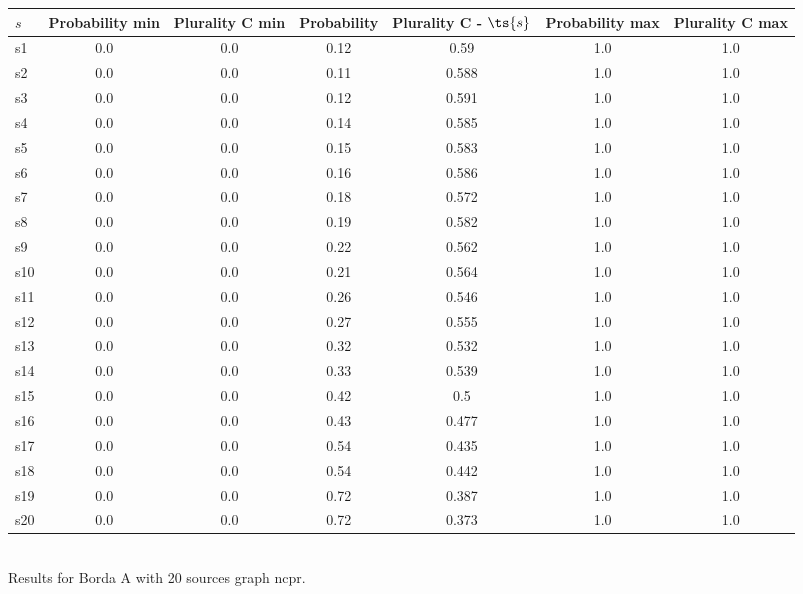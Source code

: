 \documentclass{article}
\begin{document}
\noindent\begin{tabular}{|l|c|c|c|c|c|c|}
\hline
$s$& Probability min & Plurality C min & Probability & Plurality C - $\ts{s}$ & Probability max & Plurality C max\\
\hline
s1 &0.0 & 0.0 & 0.12 & 0.59 & 1.0 & 1.0\\
\hline
s2 &0.0 & 0.0 & 0.11 & 0.588 & 1.0 & 1.0\\
\hline
s3 &0.0 & 0.0 & 0.12 & 0.591 & 1.0 & 1.0\\
\hline
s4 &0.0 & 0.0 & 0.14 & 0.585 & 1.0 & 1.0\\
\hline
s5 &0.0 & 0.0 & 0.15 & 0.583 & 1.0 & 1.0\\
\hline
s6 &0.0 & 0.0 & 0.16 & 0.586 & 1.0 & 1.0\\
\hline
s7 &0.0 & 0.0 & 0.18 & 0.572 & 1.0 & 1.0\\
\hline
s8 &0.0 & 0.0 & 0.19 & 0.582 & 1.0 & 1.0\\
\hline
s9 &0.0 & 0.0 & 0.22 & 0.562 & 1.0 & 1.0\\
\hline
s10 &0.0 & 0.0 & 0.21 & 0.564 & 1.0 & 1.0\\
\hline
s11 &0.0 & 0.0 & 0.26 & 0.546 & 1.0 & 1.0\\
\hline
s12 &0.0 & 0.0 & 0.27 & 0.555 & 1.0 & 1.0\\
\hline
s13 &0.0 & 0.0 & 0.32 & 0.532 & 1.0 & 1.0\\
\hline
s14 &0.0 & 0.0 & 0.33 & 0.539 & 1.0 & 1.0\\
\hline
s15 &0.0 & 0.0 & 0.42 & 0.5 & 1.0 & 1.0\\
\hline
s16 &0.0 & 0.0 & 0.43 & 0.477 & 1.0 & 1.0\\
\hline
s17 &0.0 & 0.0 & 0.54 & 0.435 & 1.0 & 1.0\\
\hline
s18 &0.0 & 0.0 & 0.54 & 0.442 & 1.0 & 1.0\\
\hline
s19 &0.0 & 0.0 & 0.72 & 0.387 & 1.0 & 1.0\\
\hline
s20 &0.0 & 0.0 & 0.72 & 0.373 & 1.0 & 1.0\\
\hline
\end{tabular}\\

\noindent Results for Borda A with 20 sources graph ncpr.
\end{document}

